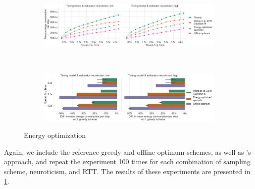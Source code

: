 \begin{figure}
    \centering
    \begin{subfigure}[t]{\textwidth}
        \centering
        \includegraphics[width=\textwidth]{figs/new_model/energy_optimization.png}
        \caption{}
    \end{subfigure}\\
    \medskip
    \begin{subfigure}[t]{\textwidth}
        \centering
        \includegraphics[width=\textwidth]{figs/new_model/energy_optimization_diff.png}
        \caption{}
    \end{subfigure}
    \caption{Energy optimization}\label{fig:optimization:energy}
\end{figure}

Again, we include the reference greedy and offline optimum schemes, as well as \textcite{Wang2019Towards}'s approach, and repeat the experiment \num{100} times for each combination of sampling scheme, neuroticism, and \ac{RTT}.
The results of these experiments are presented in \cref{fig:optimization:energy}.

